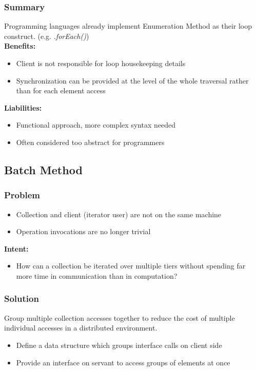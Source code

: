 \subsubsection{Summary}
Programming languages already implement Enumeration Method as their loop construct. (e.g. \textit{.forEach()})\\ 
\textbf{Benefits:}
\begin{itemize}
    \item Client is not responsible for loop housekeeping details
    \item Synchronization can be provided at the level of the whole traversal rather than for each element access
\end{itemize}
\textbf{Liabilities:}
\begin{itemize}
    \item Functional approach, more complex syntax needed
    \item Often considered too abstract for programmers
\end{itemize}

\subsection{Batch Method}
\subsubsection{Problem}
\begin{itemize}
    \item Collection and client (iterator user) are not on the same machine
    \item Operation invocations are no longer trivial
\end{itemize}
\textbf{Intent:}
\begin{itemize}
    \item How can a collection be iterated over multiple tiers without spending far more time in communication than in computation?
\end{itemize}
\subsubsection{Solution}
Group multiple collection accesses together to reduce the cost of multiple individual accesses in a distributed environment.
\begin{itemize}
    \item Define a data structure which groups interface calls on client side
    \item Provide an interface on servant to access groups of elements at once
\end{itemize}

